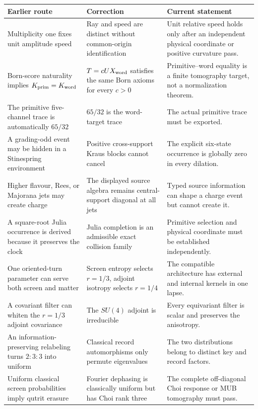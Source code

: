 \documentclass[11pt,oneside,openany]{book}
\numberwithin{equation}{chapter}
\theoremstyle{definition}
\theoremstyle{remark}
\begin{document}
\begin{longtable}{@{}p{}p{}p{}@{}}
\toprule
Earlier route & Correction & Current statement\\
\midrule
Multiplicity one fixes unit amplitude speed
& Ray and speed are distinct without common-origin identification
& Unit relative speed holds only after an independent physical coordinate or
  positive curvature pass.\\
Born-score naturality implies \(K_{\rm prim}=K_{\rm word}\)
& \(T=cUX_{\rm word}\) satisfies the same Born axioms for every \(c>0\)
& Primitive--word equality is a finite tomography target, not a normalization
  theorem.\\
The primitive five-channel trace is automatically \(65/32\)
& \(65/32\) is the word-target trace
& The actual primitive trace must be exported.\\
A grading-odd event may be hidden in a Stinespring environment
& Positive cross-support Kraus blocks cannot cancel
& The explicit six-state occurrence is globally zero in every dilation.\\
Higher flavour, Rees, or Majorana jets may create charge
& The displayed source algebra remains central-support diagonal at all jets
& Typed source information can shape a charge event but cannot create it.\\
A square-root Julia occurrence is derived because it preserves the clock
& Julia completion is an admissible exact collision family
& Primitive selection and physical coordinate must be established
  independently.\\
One oriented-turn parameter can serve both screen and matter
& Screen entropy selects \(r=1/3\), adjoint isotropy selects \(r=1/4\)
& The compatible architecture has external and internal kernels in one lapse.\\
A covariant filter can whiten the \(r=1/3\) adjoint covariance
& The \(SU(4)\) adjoint is irreducible
& Every equivariant filter is scalar and preserves the anisotropy.\\
An information-preserving relabeling turns \(2{:}3{:}3\) into uniform
& Classical record automorphisms only permute eigenvalues
& The two distributions belong to distinct key and record factors.\\
Uniform classical screen probabilities imply qutrit erasure
& Fourier dephasing is classically uniform but has Choi rank three
& The complete off-diagonal Choi response or MUB tomography must pass.\\

\end{longtable}
\end{document}
